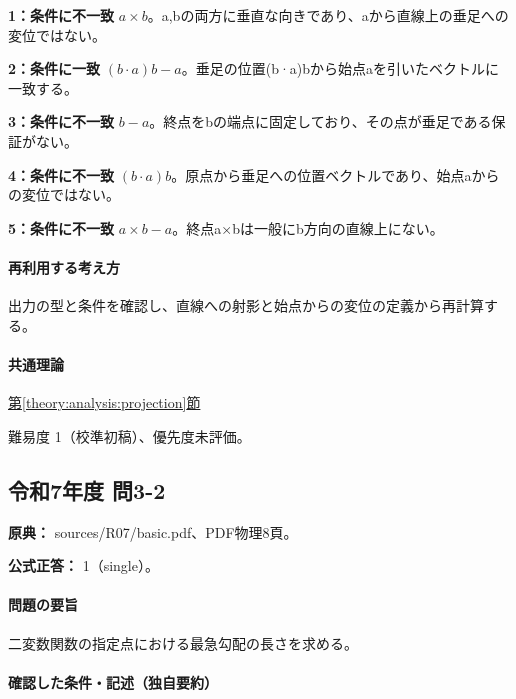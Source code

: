 \noindent\textbf{1：条件に不一致} \(a\times b\)。a,bの両方に垂直な向きであり、aから直線上の垂足への変位ではない。\par

\noindent\textbf{2：条件に一致} \((b\cdot a)b-a\)。垂足の位置(b·a)bから始点aを引いたベクトルに一致する。\par

\noindent\textbf{3：条件に不一致} \(b-a\)。終点をbの端点に固定しており、その点が垂足である保証がない。\par

\noindent\textbf{4：条件に不一致} \((b\cdot a)b\)。原点から垂足への位置ベクトルであり、始点aからの変位ではない。\par

\noindent\textbf{5：条件に不一致} \(a\times b-a\)。終点a×bは一般にb方向の直線上にない。\par

\paragraph{再利用する考え方} 出力の型と条件を確認し、直線への射影と始点からの変位の定義から再計算する。

\paragraph{共通理論} \hyperref[theory:analysis:projection]{第\ref*{theory:analysis:projection}節}

\par 難易度 1（校準初稿）、優先度未評価。

\subsection{令和7年度 問3-2}
\label{q:r07-reg-basic-3-2}

\noindent\textbf{原典：} sources/R07/basic.pdf、PDF物理8頁。

\textbf{公式正答：} 1（single）。

\paragraph{問題の要旨} 二変数関数の指定点における最急勾配の長さを求める。

\paragraph{確認した条件・記述（独自要約）}\mbox{}\par

